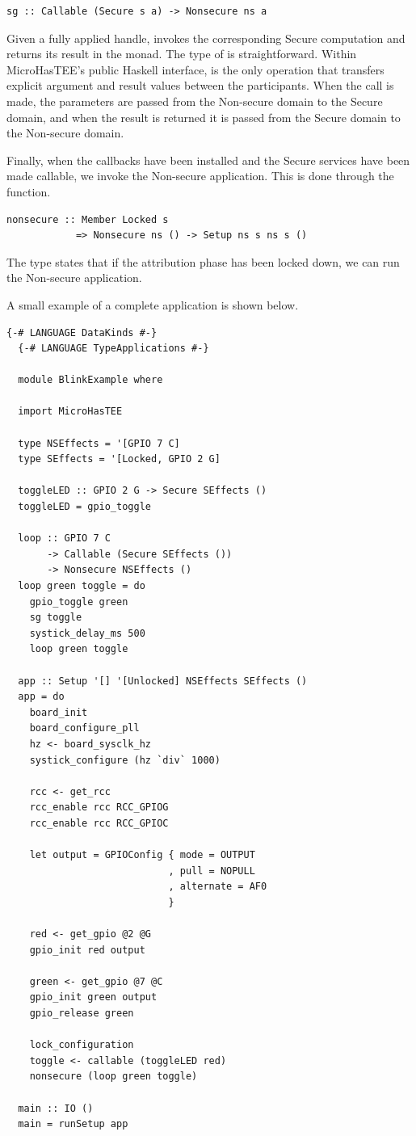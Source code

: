 \documentclass[sigconf]{acmart}
\begin{document}
\begin{lstlisting}[style=haskell]
  sg :: Callable (Secure s a) -> Nonsecure ns a
\end{lstlisting}

Given a fully applied handle,  invokes the corresponding Secure computation and returns its result in the  monad.
The type of  is straightforward.
Within MicroHasTEE's public Haskell interface,  is the only operation that transfers explicit argument and result values between the participants.
When the call is made, the parameters are passed from the Non-secure domain to the Secure domain, and when the result is returned it is passed from the Secure domain to the Non-secure domain.

Finally, when the callbacks have been installed and the Secure services have been made callable, we invoke the Non-secure application.
This is done through the  function.

\begin{lstlisting}[style=haskell]
  nonsecure :: Member Locked s
            => Nonsecure ns () -> Setup ns s ns s ()
\end{lstlisting}

The type states that if the attribution phase has been locked down, we can run the Non-secure application.

A small example of a complete application is shown below.

\begin{lstlisting}[style=haskell]
  {-# LANGUAGE DataKinds #-}
  {-# LANGUAGE TypeApplications #-}

  module BlinkExample where

  import MicroHasTEE

  type NSEffects = '[GPIO 7 C]
  type SEffects = '[Locked, GPIO 2 G]

  toggleLED :: GPIO 2 G -> Secure SEffects ()
  toggleLED = gpio_toggle

  loop :: GPIO 7 C
       -> Callable (Secure SEffects ())
       -> Nonsecure NSEffects ()
  loop green toggle = do
    gpio_toggle green
    sg toggle
    systick_delay_ms 500
    loop green toggle

  app :: Setup '[] '[Unlocked] NSEffects SEffects ()
  app = do
    board_init
    board_configure_pll
    hz <- board_sysclk_hz
    systick_configure (hz `div` 1000)

    rcc <- get_rcc
    rcc_enable rcc RCC_GPIOG
    rcc_enable rcc RCC_GPIOC

    let output = GPIOConfig { mode = OUTPUT
                            , pull = NOPULL
                            , alternate = AF0
                            }

    red <- get_gpio @2 @G
    gpio_init red output

    green <- get_gpio @7 @C
    gpio_init green output
    gpio_release green

    lock_configuration
    toggle <- callable (toggleLED red)
    nonsecure (loop green toggle)

  main :: IO ()
  main = runSetup app
\end{lstlisting}
\end{document}
